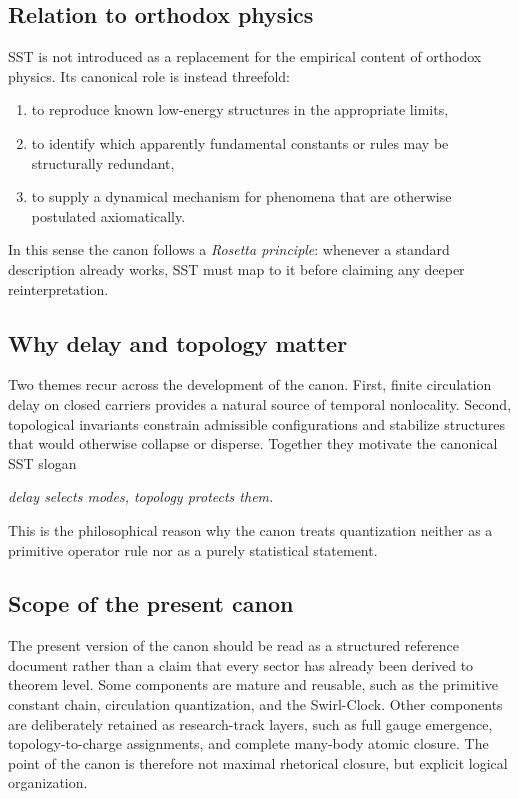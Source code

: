 \documentclass[11pt]{article}
\theoremstyle{definition}
\theoremstyle{plain}
\theoremstyle{remark}
\begin{document}
    \subsection{Relation to orthodox physics}
        SST is not introduced as a replacement for the empirical content of orthodox physics. Its canonical role is instead threefold:
        \begin{enumerate}
            \item to reproduce known low-energy structures in the appropriate limits,
            \item to identify which apparently fundamental constants or rules may be structurally redundant,
            \item to supply a dynamical mechanism for phenomena that are otherwise postulated axiomatically.
        \end{enumerate}
        In this sense the canon follows a \emph{Rosetta principle}: whenever a standard description already works, SST must map to it before claiming any deeper reinterpretation.

    \subsection{Why delay and topology matter}
        Two themes recur across the development of the canon.
        First, finite circulation delay on closed carriers provides a natural source of temporal nonlocality. Second, topological invariants constrain admissible configurations and stabilize structures that would otherwise collapse or disperse. Together they motivate the canonical SST slogan
        \begin{center}
            \textit{delay selects modes, topology protects them.}
        \end{center}
        This is the philosophical reason why the canon treats quantization neither as a primitive operator rule nor as a purely statistical statement.

    \subsection{Scope of the present canon}
        The present version of the canon should be read as a structured reference document rather than a claim that every sector has already been derived to theorem level. Some components are mature and reusable, such as the primitive constant chain, circulation quantization, and the Swirl-Clock. Other components are deliberately retained as research-track layers, such as full gauge emergence, topology-to-charge assignments, and complete many-body atomic closure. The point of the canon is therefore not maximal rhetorical closure, but explicit logical organization.
\end{document}
